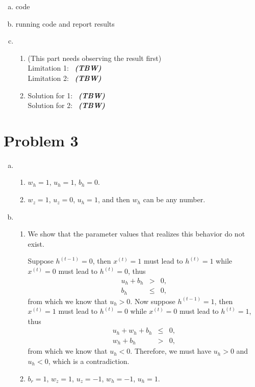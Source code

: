 \documentclass[11pt, oneside]{article}      %
\newcommand{\df}{\bfseries \em}  %
\newcommand{\tbw}{\bigskip \mbox{\color{red} {\df (TBW) }}\bigskip}
\newcommand{\hasPageBreak}{}
\begin{document}
\begin{enumerate}   [(a)]
\item code
\item running code and report results
\item 
\begin{enumerate}   [i]
\item (This part needs observing the result first)  \\
 Limitation 1: \tbw \\
 Limitation 2: \tbw 
 \item Solution for 1: \tbw \\
 Solution for 2: \tbw
\end{enumerate}

\end{enumerate}




\hasPageBreak
\section*{Problem 3}
\begin{enumerate}   [(a)]
\item 
\begin{enumerate}   [i]
\item $w_h = 1$, $u_h = 1$, $b_h = 0$.
\item $w_z = 1$, $u_z = 0$, $u_h = 1$, and then $w_h$ can be any number.
\end{enumerate}







\item
\begin{enumerate}   [i]
\item 
We show that the parameter values that realizes this  behavior do not exist. 

Suppose $h^{(t-1)} = 0$, then $x^{(t)} = 1$ must lead to $h^{(t)} = 1$ while $x^{(t)} = 0$ must lead to $h^{(t)} = 0$, thus
\begin{eqnarray*}
u_h + b_h &>& 0,
\\
b_h &\leq& 0,
\end{eqnarray*}
from which we know that $u_h > 0$. Now suppose $h^{(t-1)} = 1$, then $x^{(t)} = 1$ must lead to $h^{(t)} = 0$ while $x^{(t)} = 0$ must lead to $h^{(t)} = 1$, thus
\begin{eqnarray*}
u_h + w_h + b_h &\leq& 0,
\\
w_h + b_h &>& 0,
\end{eqnarray*}
from which we know that $u_h < 0$. Therefore, we must have $u_h > 0$ and $u_h < 0$, which is a contradiction.



\item
$b_r = 1$, $w_z = 1$, $u_z = -1$, $w_h = -1$, $u_h = 1$.
\end{enumerate}






\end{enumerate}





\end{document}
